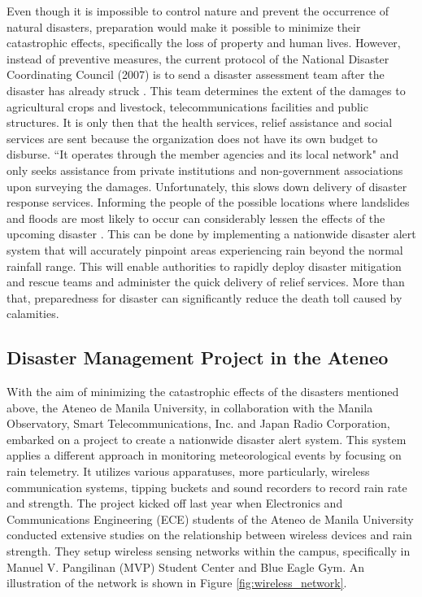 \bigskip
Even though it is impossible to control nature and prevent the occurrence of natural disasters, preparation would make it possible to minimize their catastrophic effects, specifically the loss of property and human lives. However, instead of preventive measures, the current protocol of the National Disaster Coordinating Council (2007) is to send a disaster assessment team after the disaster has already struck \cite{ndcc}. This team determines the extent of the damages to agricultural crops and livestock, telecommunications facilities and public structures. It is only then that the health services, relief assistance and social services are sent because the organization does not have its own budget to disburse. ``It operates through the member agencies and its local network" and only seeks assistance from private institutions and non-government associations upon surveying the damages. Unfortunately, this slows down delivery of disaster response services. Informing the people of the possible locations where landslides and floods are most likely to occur can considerably lessen the effects of the upcoming disaster \cite{un}. This can be done by implementing a nationwide disaster alert system that will accurately pinpoint areas experiencing rain beyond the normal rainfall range. This will enable authorities to rapidly deploy disaster mitigation and rescue teams and administer the quick delivery of relief services. More than that, preparedness for disaster can significantly reduce the death toll caused by calamities.

\subsection{Disaster Management Project in the Ateneo}

With the aim of minimizing the catastrophic effects of the disasters mentioned above, the Ateneo de Manila University, in collaboration with the Manila Observatory, Smart Telecommunications, Inc. and Japan Radio Corporation, embarked on a project to create a nationwide disaster alert system. This system applies a different approach in monitoring meteorological events by focusing on rain telemetry. It utilizes various apparatuses, more particularly, wireless communication systems, tipping buckets and sound recorders to record rain rate and strength. The project kicked off last year when Electronics and Communications Engineering (ECE) students of the Ateneo de Manila University conducted extensive studies on the relationship between wireless devices and rain strength. They setup wireless sensing networks within the campus, specifically in Manuel V. Pangilinan (MVP) Student Center and Blue Eagle Gym. An illustration of the network is shown in Figure \ref{fig:wireless_network}. 

